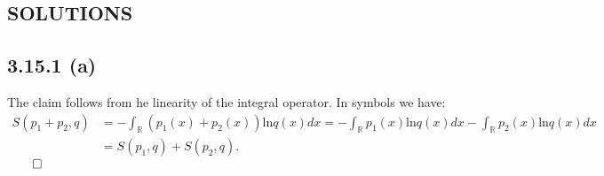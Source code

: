 \documentclass{exam}
\renewenvironment{proof}{{\noindent\itshape\ignorespaces}}{{\hfill$\qed$\\}}
\begin{document}
\newpage

\begin{center}    
    \section*{SOLUTIONS}
\end{center}

\subsection*{3.15.1 (a)}
The claim follows from he linearity of the integral operator. In symbols we have:\\
\begin{proof}
    \begin{equation*}
        \begin{aligned}
            S(p_1 + p_2,q) &= -\displaystyle\int_{\mathbb{R}} (p_1(x) + p_2(x)) \text{ln}q(x) dx = - \displaystyle\int_{\mathbb{R}} p_1(x) \text{ln}q(x) dx - \displaystyle\int_{\mathbb{R}} p_2(x) \text{ln}q(x) dx \\
            &=S(p_1,q) + S(p_2,q).
        \end{aligned}    
    \end{equation*}
\end{proof}

\end{document}
